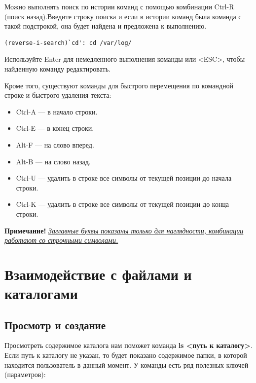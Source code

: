 \documentclass[14pt, a4paper]{article}
\begin{document}
Можно выполнять поиск по истории команд с помощью комбинации Ctrl-R (поиск
назад).Введите строку поиска и если в истории команд была команда с такой подстрокой, она
будет найдена и предложена к выполнению.

\begin{lstlisting}
(reverse-i-search)`cd': cd /var/log/
\end{lstlisting}

Используйте Enter для немедленного выполнения команды или <ESC>, чтобы найденную
команду редактировать.

Кроме того, существуют команды для быстрого перемещения по командной строке и
быстрого удаления текста:

\begin{itemize}
    \item Ctrl-A — в начало строки.
    \item Ctrl-E — в конец строки.
    \item Alt-F — на слово вперед.
    \item Alt-B — на слово назад.
    \item Ctrl-U — удалить в строке все символы от текущей позиции до начала строки.
    \item Ctrl-K — удалить в строке все символы от текущей позиции до конца строки.
\end{itemize}
\textbf{Примечание!} \textit{\uline{Заглавные буквы показаны только для наглядности, комби\-нации работают со
строчными символами.}}




\section*{Взаимодействие с файлами и каталогами}

\subsection*{Просмотр и создание}

Просмотреть содержимое каталога нам поможет команда \textbf{ls <путь к каталогу>}. Если путь к
каталогу не указан, то будет показано содержимое папки, в которой находится пользователь в данный
момент. У команды есть ряд полезных ключей (параметров):
\end{document}

